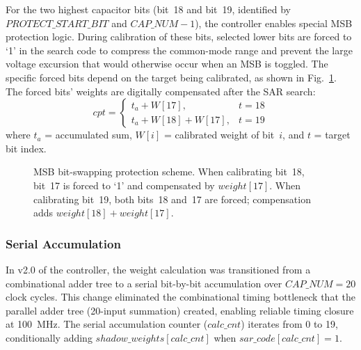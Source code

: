 \documentclass[journal]{IEEEtran}
\begin{document}
For the two highest capacitor bits (bit~18 and bit~19, identified by
$PROTECT\_START\_BIT$ and $CAP\_NUM-1$), the controller enables special MSB
protection logic. During calibration of these bits, selected lower bits are
forced to `1' in the search code to compress the common-mode range and prevent
the large voltage excursion that would otherwise occur when an MSB is toggled.
The specific forced bits depend on the target being calibrated, as shown in
Fig.~\ref{fig:msb_protection}. The forced bits' weights are digitally compensated after the SAR search:
%
\begin{equation}
cpt = \begin{cases}
t_a + W[17],           & t = 18 \\
t_a + W[18] + W[17],  & t = 19
\end{cases}
\label{eq:msb_compensation}
\end{equation}
%
where $t_a$ = accumulated sum, $W[i]$ = calibrated weight of bit~$i$,
and $t$ = target bit index.

\begin{figure}[!t]
\centering
{}
\caption{MSB bit-swapping protection scheme. When calibrating bit~18, bit~17
is forced to `1' and compensated by $weight[17]$. When calibrating bit~19, both
bits~18 and~17 are forced; compensation adds $weight[18] + weight[17]$.}
\label{fig:msb_protection}
\end{figure}

\subsubsection{Serial Accumulation}

In v2.0 of the controller, the weight calculation was transitioned from a
combinational adder tree to a serial bit-by-bit accumulation over
$CAP\_NUM = 20$ clock cycles. This change eliminated the combinational timing
bottleneck that the parallel adder tree (20-input summation) created, enabling
reliable timing closure at 100~MHz. The serial accumulation counter
($calc\_cnt$) iterates from 0 to 19, conditionally adding
$shadow\_weights[calc\_cnt]$ when $sar\_code[calc\_cnt] = 1$.
\end{document}
